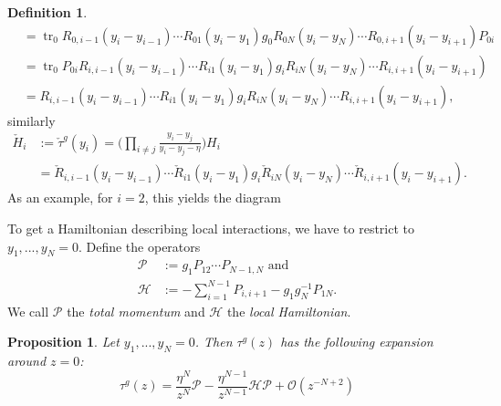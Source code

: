 \documentclass[11pt]{report}
\newtheorem{prop}[theorem]{Proposition}
\theoremstyle{definition}
\newtheorem{definition}[theorem]{Definition}
\theoremstyle{remark}
\theoremstyle{remark}
\begin{document}
\begin{definition}
\begin{align*}
&= \operatorname{tr}_0 R_{0,i-1}(y_i-y_{i-1}) \cdots R_{01}(y_i-y_1) g_0 R_{0N}(y_i-y_N) \cdots R_{0,i+1}(y_i-y_{i+1}) P_{0i} \\
&= \operatorname{tr}_0 P_{0i} R_{i,i-1}(y_i-y_{i-1}) \cdots R_{i1}(y_i-y_1) g_i R_{iN}(y_i-y_N) \cdots R_{i,i+1}(y_i-y_{i+1}) \\
&= R_{i,i-1}(y_i-y_{i-1}) \cdots R_{i1}(y_i-y_1) g_i R_{iN}(y_i-y_N) \cdots R_{i,i+1}(y_i-y_{i+1}),
\end{align*}
similarly
\begin{align*}
\check H_i
&:= \check \tau^g(y_i) = \bigg( \prod_{i \neq j} \frac{y_i-y_j}{y_i-y_j-\eta} \bigg) H_i \\
&= \check R_{i,i-1}(y_i-y_{i-1}) \cdots \check R_{i1}(y_i-y_1) g_i \check R_{iN}(y_i-y_N) \cdots \check R_{i,i+1}(y_i-y_{i+1}).
\end{align*}
As an example, for $i=2$, this yields the diagram
~\\
\begin{center}
\end{center}
To get a Hamiltonian describing local interactions, we have to restrict to $y_1,...,y_N = 0$. Define the operators
\begin{align*}
\mathcal{P} &:= g_1 P_{12} \cdots P_{N-1,N} \text{ and} \\
\mathcal{H} &:= -\sum_{i=1}^{N-1} P_{i,i+1} - g_1 g_N^{-1} P_{1N}.
\end{align*}
We call $\mathcal{P}$ the \emph{total momentum} and $\mathcal{H}$ the \emph{local Hamiltonian}.
\end{definition}

\begin{prop}
Let $y_1,...,y_N = 0$. Then $\tau^g(z)$ has the following expansion around $z=0$:
\begin{equation*}
\tau^g(z) = \frac{\eta^N}{z^N} \mathcal{P} - \frac{\eta^{N-1}}{z^{N-1}} \mathcal{H} \mathcal{P} + \mathcal{O}(z^{-N+2})
\end{equation*}
\end{prop}
\end{document}
